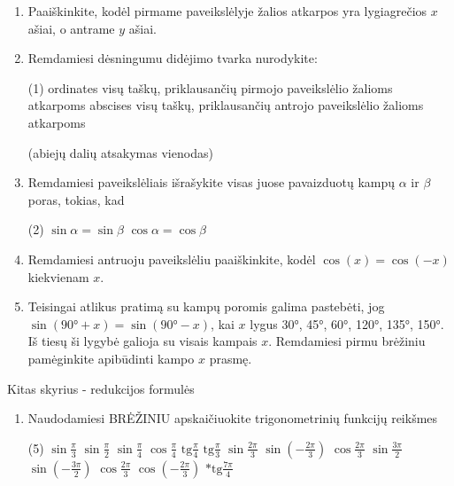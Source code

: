 \documentclass[a4paper]{article}
\newcommand{\hitem}[1]{\item[\stepcounter{enumi}\href{#1}{\theenumi.}]} %
\newcounter{nameOfYourChoice}
\newcommand{\resume}{\setcounter{enumi}{\value{nameOfYourChoice}}} %
\begin{document}
\begin{mdframed}[backgroundcolor=blue!10!white, linewidth=3pt]
\begin{minipage}[b]{0.45\linewidth}
\end{minipage}
\begin{enumerate}
\resume
\item Paaiškinkite, kodėl pirmame paveikslėlyje žalios atkarpos yra lygiagrečios $x$ ašiai, o antrame $y$ ašiai.
\item Remdamiesi dėsningumu didėjimo tvarka nurodykite:
\begin{tasks}(1) 
\task ordinates visų taškų, priklausančių pirmojo paveikslėlio žalioms atkarpoms
\task abscises visų taškų, priklausančių antrojo paveikslėlio žalioms atkarpoms
\end{tasks}
(abiejų dalių atsakymas vienodas)
\item Remdamiesi paveikslėliais išrašykite visas juose pavaizduotų kampų $\alpha$ ir $\beta$ poras, tokias, kad 
\begin{tasks}(2) 
\task $\sin{\alpha}=\sin{\beta}$
\task $\cos{\alpha}=\cos{\beta}$
\end{tasks}
\item Remdamiesi antruoju paveikslėliu paaiškinkite, kodėl $\cos(x)=\cos(-x)$ kiekvienam $x$.
\item Teisingai atlikus pratimą su kampų poromis galima pastebėti, jog $\sin(\text{90°}+x)=\sin(\text{90°}-x)$, kai $x$ lygus 30°, 45°, 60°, 120°, 135°, 150°. Iš tiesų ši lygybė galioja su visais kampais $x$. Remdamiesi pirmu brėžiniu pamėginkite apibūdinti kampo $x$ prasmę.
\end{enumerate}
\end{mdframed}

Kitas skyrius - redukcijos formulės

\begin{mdframed}[backgroundcolor=blue!10!white, linewidth=3pt]
\begin{enumerate}
\hitem{} Naudodamiesi BRĖŽINIU apskaičiuokite trigonometrinių funkcijų reikšmes
\begin{tasks}(5)
\task $\sin{\frac{\pi}{3}}$
\task $\sin{\frac{\pi}{2}}$
\task $\sin{\frac{\pi}{4}}$
\task $\cos{\frac{\pi}{4}}$
\task $\text{tg}{\frac{\pi}{4}}$
\task $\text{tg}{\frac{\pi}{3}}$
\task $\sin{\frac{2\pi}{3}}$
\task $\sin{\left(-\frac{2\pi}{3}\right)}$
\task $\cos{\frac{2\pi}{3}}$
\task $\sin{\frac{3\pi}{2}}$
\task $\sin{\left(-\frac{3\pi}{2}\right)}$
\task $\cos{\frac{2\pi}{3}}$
\task $\cos{\left(-\frac{2\pi}{3}\right)}$
\task $\text{*tg}\frac{7\pi}{4}$
\end{tasks}
\end{enumerate}
\end{mdframed}
\end{document}
